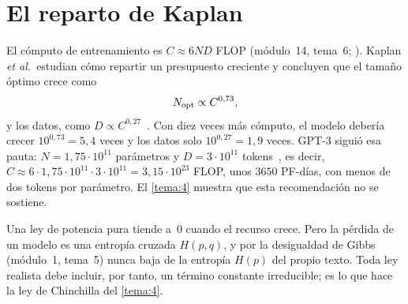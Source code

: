 \section{El reparto de Kaplan}

El cómputo de entrenamiento es $C\approx 6ND$ FLOP (módulo~14, tema~6; \cite[§2.1]{kaplan}). Kaplan \emph{et al.}\ estudian cómo repartir un presupuesto creciente y concluyen que el tamaño óptimo crece como~\cite[ecuación~(6.1)]{kaplan}
\[
N_{\mathrm{opt}}\propto C^{0{,}73},
\]
y los datos, como $D\propto C^{0{,}27}$~\cite[§1.1]{kaplan}. Con diez veces más cómputo, el modelo debería crecer $10^{0{,}73}=5{,}4$ veces y los datos solo $10^{0{,}27}=1{,}9$ veces. GPT-3 siguió esa pauta: $N=1{,}75\cdot 10^{11}$ parámetros y $D=3\cdot 10^{11}$ tokens~\cite{brown}, es decir, $C\approx 6\cdot 1{,}75\cdot 10^{11}\cdot 3\cdot 10^{11}=3{,}15\cdot 10^{23}$ FLOP, unos $3650$ PF-días, con menos de dos tokens por parámetro. El \cref{tema:4} muestra que esta recomendación no se sostiene.

\begin{observacion}
Una ley de potencia pura tiende a~$0$ cuando el recurso crece. Pero la pérdida de un modelo es una entropía cruzada $H(p,q)$, y por la desigualdad de Gibbs (módulo~1, tema~5) nunca baja de la entropía $H(p)$ del propio texto. Toda ley realista debe incluir, por tanto, un término constante irreducible; es lo que hace la ley de Chinchilla del \cref{tema:4}.
\end{observacion}

